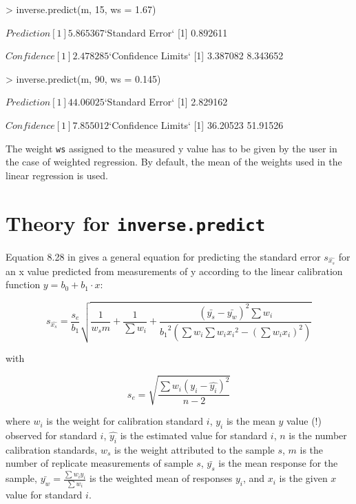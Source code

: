 \documentclass[a4paper]{article}
\begin{document}
\begin{Schunk}
\begin{Sinput}
> inverse.predict(m, 15, ws = 1.67)
\end{Sinput}
\begin{Soutput}
$Prediction
[1] 5.865367

$`Standard Error`
[1] 0.892611

$Confidence
[1] 2.478285

$`Confidence Limits`
[1] 3.387082 8.343652
\end{Soutput}
\begin{Sinput}
> inverse.predict(m, 90, ws = 0.145)
\end{Sinput}
\begin{Soutput}
$Prediction
[1] 44.06025

$`Standard Error`
[1] 2.829162

$Confidence
[1] 7.855012

$`Confidence Limits`
[1] 36.20523 51.91526
\end{Soutput}
\end{Schunk}

The weight \texttt{ws} assigned to the measured y value has to be 
given by the user in the case of weighted regression. By default, 
the mean of the weights used in the linear regression is used.

\section*{Theory for \texttt{inverse.predict}}
Equation 8.28 in \cite{massart97} gives a general equation for predicting the
standard error $s_{\hat{x_s}}$ for an x value predicted from measurements of y
according to the linear calibration function $ y = b_0 + b_1 \cdot x$:

\begin{equation}
s_{\hat{x_s}} = \frac{s_e}{b_1} \sqrt{\frac{1}{w_s m} + \frac{1}{\sum{w_i}} +
    \frac{(\bar{y_s} - \bar{y_w})^2 \sum{w_i}}
        {{b_1}^2 \left( \sum{w_i} \sum{w_i {x_i}^2} - 
            {\left( \sum{ w_i x_i } \right)}^2 \right) }}
\end{equation}

with

\begin{equation}
s_e = \sqrt{ \frac{\sum w_i (y_i - \hat{y_i})^2}{n - 2}}
\end{equation}

where $w_i$ is the weight for calibration standard $i$, $y_i$ is the mean $y$
value (!) observed for standard $i$, $\hat{y_i}$ is the estimated value for
standard $i$, $n$ is the number calibration standards, $w_s$ is the weight
attributed to the sample $s$, $m$ is the number of replicate measurements of
sample $s$, $\bar{y_s}$ is the mean response for the sample, 
$\bar{y_w} = \frac{\sum{w_i y_i}}{\sum{w_i}}$ is the weighted mean of responses
$y_i$, and $x_i$ is the given $x$ value for standard $i$.
\end{document}
